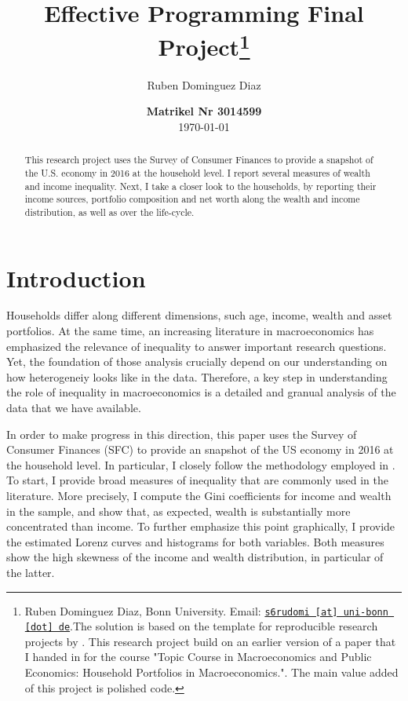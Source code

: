 \documentclass[11pt, a4paper, leqno]{article}
\begin{document}
\title{Effective Programming Final Project\thanks{Ruben Dominguez Diaz, Bonn University. Email: \href{mailto:s6rudomi@uni-bonn.de}{\nolinkurl{s6rudomi [at] uni-bonn [dot] de}}.The solution is based on the template for reproducible research projects by \citet{GaudeckerEconProjectTemplates}. This research project build on an earlier version of a paper that I handed in for the course "Topic Course in Macroeconomics and Public Economics: Household Portfolios in Macroeconomics.". The main value added of this project is polished code.} }

\author{Ruben Dominguez Diaz}

\date{
{\bf Matrikel Nr 3014599} 
\\[1ex] 
\today
}

\maketitle

\begin{abstract}
	This research project uses the Survey of Consumer Finances to provide a snapshot of the U.S. economy in 2016 at the household level. I report several measures of wealth and income inequality. Next, I take a closer look to the households, by reporting their income sources, portfolio composition and net worth along the wealth and income distribution, as well as over the life-cycle.
\end{abstract}
\clearpage

\section{Introduction} 
\label{sec:introduction}
    Households differ along different dimensions, such age, income, wealth and asset portfolios. At the same time, an increasing literature in macroeconomics has emphasized the relevance of inequality to answer important research questions. Yet, the foundation of those analysis crucially depend on our understanding on how heterogeneiy looks like in the data. Therefore, a key step in understanding the role of inequality in macroeconomics is a detailed and granual analysis of the data that we have available.

    In order to make progress in this direction, this paper uses the Survey of Consumer Finances (SFC) to provide an snapshot of the US economy in 2016 at the household level. In particular, I closely follow the methodology employed in \citet{Kuhn2016}. To start, I provide broad measures of inequality that are commonly used in the literature. More precisely, I compute the Gini coefficients for income and wealth in the sample, and show that, as expected, wealth is substantially more concentrated than income. To further emphasize this point graphically, I provide the estimated Lorenz curves and histograms for both variables. Both measures show the high skewness of the income and wealth distribution, in particular of the latter.
\end{document}
